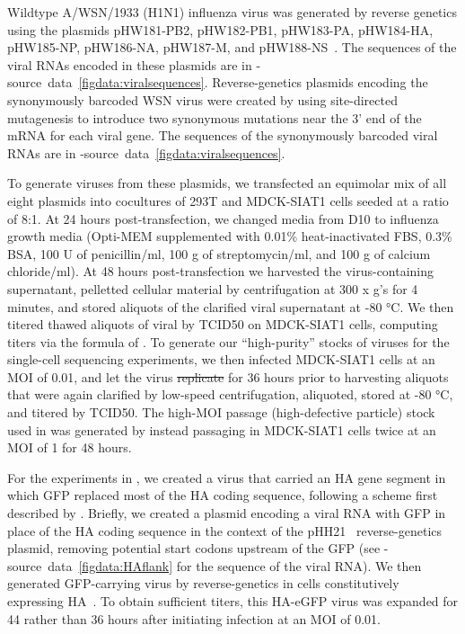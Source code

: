 \documentclass[9pt,lineno]{elife}
\providecommand{\DIFadd}[1]{{\protect\color{blue}\uwave{#1}}} %
\providecommand{\DIFdel}[1]{{\protect\color{red}\sout{#1}}}                      %
\providecommand{\DIFaddbegin}{} %
\providecommand{\DIFaddend}{} %
\providecommand{\DIFdelbegin}{} %
\providecommand{\DIFdelend}{} %
\begin{document}
Wildtype A/WSN/1933 (H1N1) influenza virus was generated by reverse genetics using the plasmids pHW181-PB2, pHW182-PB1, pHW183-PA, pHW184-HA, pHW185-NP, pHW186-NA, pHW187-M, and pHW188-NS~\citep{hoffmann2000dna}.
The sequences of the viral RNAs encoded in these plasmids are in -source~data~\ref{figdata:viralsequences}.
Reverse-genetics plasmids encoding the synonymously barcoded WSN virus were created by using site-directed mutagenesis to introduce two synonymous mutations near the 3' end of the mRNA for each viral gene.
The sequences of the synonymously barcoded viral RNAs are in -source~data~\ref{figdata:viralsequences}.

To generate viruses from these plasmids, we transfected an equimolar mix of all eight plasmids into cocultures of 293T and MDCK-SIAT1 cells seeded at a ratio of 8:1. 
At 24 hours post-transfection, we changed media from D10 to influenza growth media (Opti-MEM supplemented with 0.01\% heat-inactivated FBS, 0.3\% BSA, 100 U of penicillin/ml, 100  \si{\micro}g of streptomycin/ml, and 100 \si{\micro}g of calcium chloride/ml).
At 48 hours post-transfection we harvested the virus-containing supernatant, pelletted cellular material by centrifugation at 300 x g's for 4 minutes, and stored aliquots of the clarified viral supernatant at -80 \si{\degreeCelsius }. 
We then titered thawed aliquots of viral by TCID50 on MDCK-SIAT1 cells, computing titers via the formula of \citet{reed1938simple}.
To generate our ``high-purity'' stocks of viruses for the single-cell sequencing experiments, we then infected MDCK-SIAT1 cells at an MOI of 0.01, and let the virus \DIFdelbegin \DIFdel{replicate }\DIFdelend \DIFaddbegin \DIFadd{grow }\DIFaddend for 36 hours prior to harvesting aliquots that were again clarified by low-speed centrifugation, aliquoted, stored at -80  \si{\degreeCelsius }, and titered by TCID50.
The high-MOI passage (high-defective particle) stock used in  was generated by instead passaging in MDCK-SIAT1 cells twice at an MOI of 1 for 48 hours.

For the experiments in , we created a virus that carried an HA gene segment in which GFP replaced most of the HA coding sequence, following a scheme first described by \citet{marsh2007specific}.
Briefly, we created a plasmid encoding a viral RNA with GFP in place of the HA coding sequence in the context of the pHH21~\citep{Neumann:1999ws} reverse-genetics plasmid, removing potential start codons upstream of the GFP (see -source~data~\ref{figdata:HAflank} for the sequence of the viral RNA).
We then generated GFP-carrying virus by reverse-genetics in cells constitutively expressing HA~\citep{Doud:2016gm}.
To obtain sufficient titers, this HA-eGFP virus was expanded for 44 rather than 36 hours after initiating infection at an MOI of 0.01.
\end{document}
